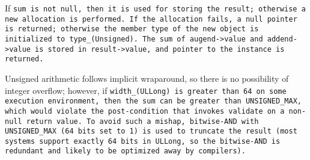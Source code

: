If \tt{sum} is not null, then it is used for storing the result;
otherwise a new allocation is performed. If the allocation fails,
a null pointer is returned; otherwise the member \tt{type}
of the new object is initialized to \tt{type_(Unsigned)}.
The sum of \tt{augend->value} and \tt{addend->value} is stored
in \tt{result->value}, and pointer to the instance is returned.

\note Unsigned arithmetic follows implicit wraparound,
so there is no possibility of integer overflow; however,
if \tt{width_(ULLong)} is greater than 64 on some execution environment,
then the sum can be greater than \tt{UNSIGNED_MAX}, which would violate
the post-condition that invokes \tt{validate} on a non-null return value.
To avoid such a mishap, bitwise-AND with \tt{UNSIGNED_MAX} (64 bits set to 1) is
used to truncate the result (most systems support exactly 64 bits in \tt{ULLong},
so the bitwise-AND is redundant and likely to be optimized away by compilers).
